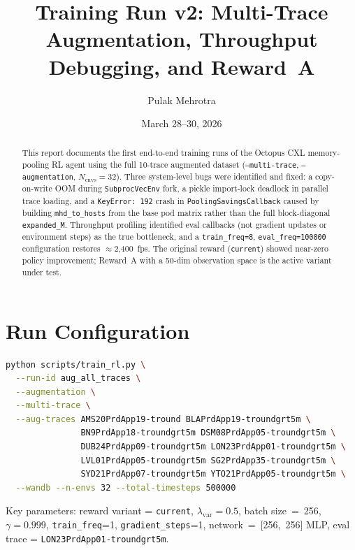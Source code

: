\documentclass[11pt]{article}
\title{Training Run v2: Multi-Trace Augmentation, Throughput Debugging, and Reward~A}
\author{Pulak Mehrotra}
\date{March 28--30, 2026}
\begin{document}
\maketitle

\begin{abstract}
This report documents the first end-to-end training runs of the Octopus
CXL memory-pooling RL agent using the full 10-trace augmented dataset
(\texttt{--multi-trace}, \texttt{--augmentation}, $N_\text{envs}=32$).
Three system-level bugs were identified and fixed: a copy-on-write OOM
during \texttt{SubprocVecEnv} fork, a pickle import-lock deadlock in
parallel trace loading, and a \texttt{KeyError: 192} crash in
\texttt{PoolingSavingsCallback} caused by building \texttt{mhd\_to\_hosts}
from the base pod matrix rather than the full block-diagonal
\texttt{expanded\_M}.
Throughput profiling identified eval callbacks (not gradient updates or
environment steps) as the true bottleneck, and a \texttt{train\_freq=8},
\texttt{eval\_freq=100000} configuration restores $\approx$2,400~fps.
The original reward (\texttt{current}) showed near-zero policy improvement;
Reward~A with a 50-dim observation space is the active variant under test.
\end{abstract}

\section{Run Configuration}

\begin{lstlisting}[language=bash]
python scripts/train_rl.py \
  --run-id aug_all_traces \
  --augmentation \
  --multi-trace \
  --aug-traces AMS20PrdApp19-tround BLAPrdApp19-troundgrt5m \
               BN9PrdApp18-troundgrt5m DSM08PrdApp05-troundgrt5m \
               DUB24PrdApp09-troundgrt5m LON23PrdApp01-troundgrt5m \
               LVL01PrdApp05-troundgrt5m SG2PrdApp35-troundgrt5m \
               SYD21PrdApp07-troundgrt5m YTO21PrdApp05-troundgrt5m \
  --wandb --n-envs 32 --total-timesteps 500000
\end{lstlisting}

\noindent Key parameters: reward variant = \texttt{current}, $\lambda_\text{var}=0.5$,
batch size~=~256, $\gamma=0.999$, \texttt{train\_freq}=1,
\texttt{gradient\_steps}=1, network~=~[256,~256] MLP,
eval trace = \texttt{LON23PrdApp01-troundgrt5m}.
\end{document}
